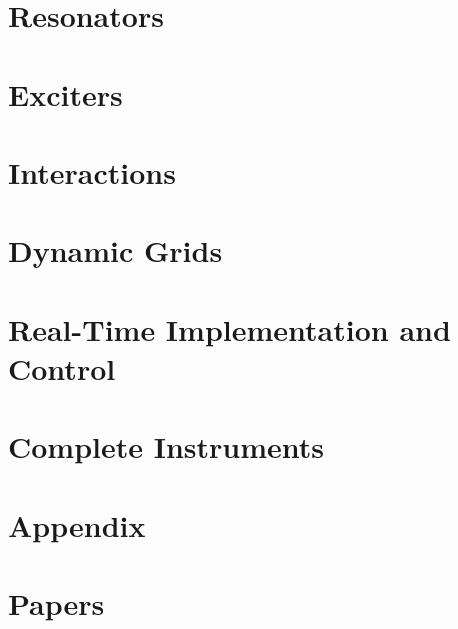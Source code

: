 \part{Resonators}\label{part:resonators}


\part{Exciters}\label{part:exciters}


\part{Interactions}\label{part:interactions}


\part{Dynamic Grids}\label{part:dynamic}


\part{Real-Time Implementation and Control}\label{part:realtime}


\part{Complete Instruments}\label{part:instrument}


\pagebreak

{}
\appendix
\part{Appendix}


\renewcommand\appendixname{Paper} 
\setcounter{chapter}{0} %
\part{Papers}\label{prt:papers}


\titleformat{%
  \chapter
}[%
display%
]{%
  \normalfont\huge 
}{%
  \begin{center}\color{aaublue}\chaptertitlename\ \thechapter\end{center}
}{%
  1cm
}{%
  \thispagestyle{empty}\begin{center}\Large
[%
]
  \end{center}}


